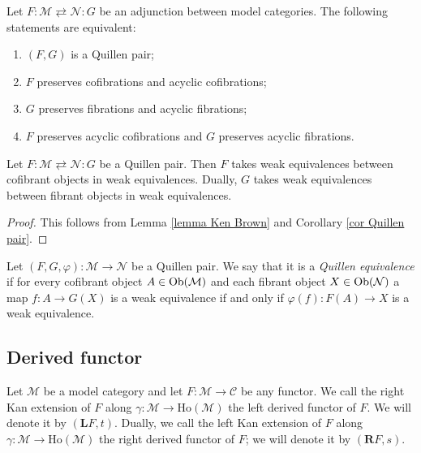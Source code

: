 \begin{cor} \label{cor Quillen pair}
Let $F \colon \mathcal M \rightleftarrows \mathcal N \colon G$ be an adjunction between model categories. The following statements are equivalent:
\begin{enumerate}
\item $(F,G)$ is a Quillen pair;
\item $F$ preserves cofibrations and acyclic cofibrations;
\item $G$ preserves fibrations and acyclic fibrations;
\item $F$ preserves acyclic cofibrations and $G$ preserves acyclic fibrations.
\end{enumerate}
\end{cor}

\begin{cor}
Let $F \colon \mathcal M \rightleftarrows \mathcal N \colon G$ be a Quillen pair. Then $F$ takes weak equivalences between cofibrant objects in weak equivalences. Dually, $G$ takes weak equivalences between fibrant objects in weak equivalences.
\end{cor}

\begin{proof}
This follows from Lemma \ref{lemma Ken Brown} and Corollary \ref{cor Quillen pair}.
\end{proof}

\begin{defin}
Let $(F,G,\varphi) \colon \mathcal M \to \mathcal N$ be a Quillen pair. We say that it is a \emph{Quillen equivalence} if for every cofibrant object $A \in \mathrm{Ob}(\mathcal M)$ and each fibrant object $X \in \mathrm{Ob}(\mathcal N)$ a map $f \colon A \to G(X)$ is a weak equivalence if and only if $\varphi(f) \colon F(A) \to X$ is a weak equivalence.
\end{defin}

\subsection{Derived functor}

\begin{defin}
Let $\mathcal M$ be a model category and let $F \colon \mathcal M \to \mathcal C$ be any functor. We call the right Kan extension of $F$ along $\gamma \colon \mathcal M \to \text{Ho}(\mathcal M)$ the left derived functor of $F$. We will denote it by $(\mathbf LF,t)$. Dually, we call the left Kan extension of $F$ along $\gamma \colon \mathcal M \to \text{Ho}(\mathcal M)$ the right derived functor of $F$; we will denote it by $(\mathbf RF,s)$.
\end{defin}

